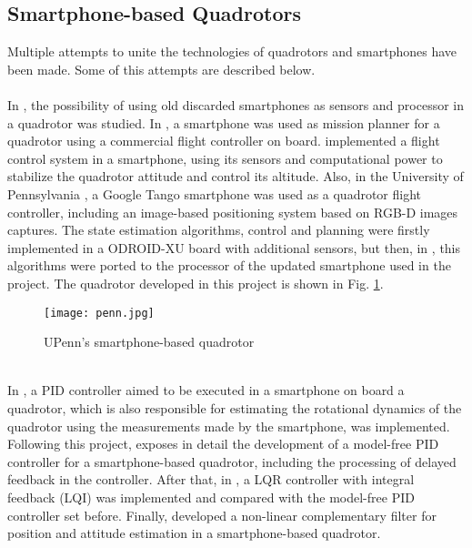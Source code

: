 \subsection{Smartphone-based Quadrotors}
Multiple attempts to unite the technologies of quadrotors and smartphones have been made. Some of this attempts are described below.
\\\\
In \cite{Isuru2017}, the possibility of using old discarded smartphones as sensors and processor in a quadrotor was studied. In \cite{Pearce2014a}, a smartphone was used as mission planner for a quadrotor using a commercial flight controller on board. \cite{ALEMARK2014a} implemented a flight control system in a smartphone, using its sensors and computational power to stabilize the quadrotor attitude and control its altitude. Also, in the University of Pennsylvania \cite{Loianno2015}, a Google Tango smartphone was used as a quadrotor flight controller, including an image-based positioning system based on RGB-D images captures. The state estimation algorithms, control and planning were firstly implemented in a ODROID-XU board with additional sensors, but then, in \cite{Loianno2015a}, this algorithms were ported to the processor of the updated smartphone used in the project. The quadrotor developed in this project is shown in Fig. \ref{fig:penn}.
\begin{figure}[h]
\begin{center}
\texttt{[image: penn.jpg]}    
\caption[UPenn's smartphone-based quadrotor]{UPenn's smartphone-based quadrotor \protect\footnotemark} 
\label{fig:penn}
\end{center}
\end{figure}
\\
In \cite{Alsharif2016}, a PID controller aimed to be executed in a smartphone on board a quadrotor, which is also responsible for estimating the rotational dynamics of the quadrotor using the measurements made by the smartphone, was implemented. Following this project, \cite{Alsharif2017} exposes in detail the development of a model-free PID controller for a smartphone-based quadrotor, including the processing of delayed feedback in the controller. After that, in \cite{Alsharif2017a}, a LQR controller with integral feedback (LQI) was implemented and compared with the model-free PID controller set before. 
Finally, \cite{Aldrovandi2015} developed a non-linear complementary filter for position and attitude estimation in a smartphone-based quadrotor.

